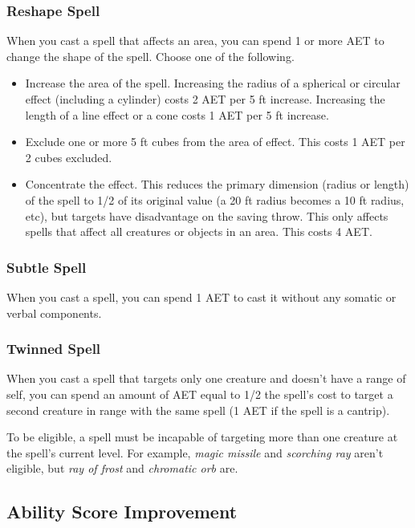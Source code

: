\subsubsection{Reshape Spell}
When you cast a spell that affects an area, you can spend 1 or more AET to change the shape of the spell. Choose one of the following.
\begin{itemize}
  \item Increase the area of the spell. Increasing the radius of a spherical or circular effect (including a cylinder) costs 2 AET per 5 ft increase. Increasing the length of a line effect or a cone costs 1 AET per 5 ft increase.
  \item Exclude one or more 5 ft cubes from the area of effect. This costs 1 AET per 2 cubes excluded.
  \item Concentrate the effect. This reduces the primary dimension (radius or length) of the spell to 1/2 of its original value (a 20 ft radius becomes a 10 ft radius, etc), but targets have disadvantage on the saving throw. This only affects spells that affect all creatures or objects in an area. This costs 4 AET.
\end{itemize}

\subsubsection{Subtle Spell}

When you cast a spell, you can spend 1 AET to cast it without any somatic or verbal components.

\subsubsection{Twinned Spell}

When you cast a spell that targets only one creature and doesn't have a range of self, you can spend an amount of AET equal to 1/2 the spell's cost to target a second creature in range with the same spell (1 AET if the spell is a cantrip).

To be eligible, a spell must be incapable of targeting more than one creature at the spell's current level. For example, \textit{magic missile} and \textit{scorching ray} aren't eligible, but \textit{ray of frost} and \textit{chromatic orb} are.

\subsection{Ability Score Improvement}


